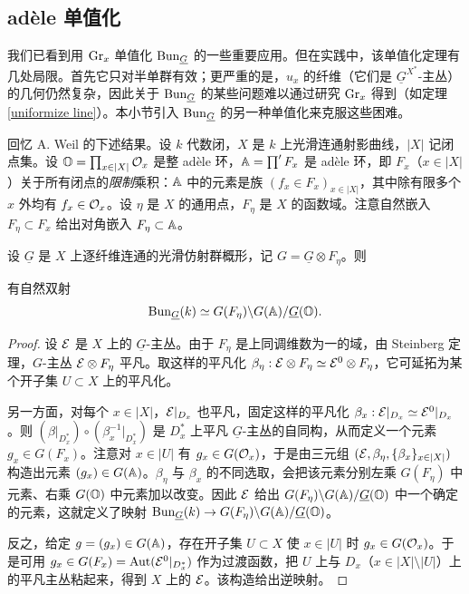 
\subsection{adèle 单值化}

我们已看到用 ${\operatorname{Gr}}_x$ 单值化 ${\operatorname{Bun}}_{\underline G}$ 的一些重要应用。但在实践中，该单值化定理有几处局限。首先它只对半单群有效；更严重的是，$u_x$ 的纤维（它们是 $\underline G^{X^*}$-主丛）的几何仍然复杂，因此关于 ${\operatorname{Bun}}_{\underline G}$ 的某些问题难以通过研究 ${\operatorname{Gr}}_x$ 得到（如定理 \ref{uniformize line}）。本小节引入 ${\operatorname{Bun}}_{\underline G}$ 的另一种单值化来克服这些困难。

回忆 A. Weil 的下述结果。设 $k$ 代数闭，$X$ 是 $k$ 上光滑连通射影曲线，$|X|$ 记闭点集。设 ${\mathbb O}=\prod_{x\in |X|} {\mathcal O}_x$ 是整 adèle 环，${\mathbb A}=\prod' F_x$ 是 adèle 环，即 $F_x$（$x\in |X|$）关于所有闭点的\emph{限制}乘积：${\mathbb A}$ 中的元素是族 $(f_x\in F_x)_{x\in |X|}$，其中除有限多个 $x$ 外均有 $f_x\in {\mathcal O}_x$。设 $\eta$ 是 $X$ 的通用点，$F_\eta$ 是 $X$ 的函数域。注意自然嵌入 $F_\eta\subset F_x$ 给出对角嵌入 $F_\eta\subset {\mathbb A}$。

设 $\underline G$ 是 $X$ 上逐纤维连通的光滑仿射群概形，记 $G=\underline G\otimes F_\eta$。则

\begin{lem}
有自然双射
\begin{equation}\label{Weil}
{\operatorname{Bun}}_{\underline G}(k)\simeq G(F_\eta)\backslash G({\mathbb A})/\underline G({\mathbb O}).
\end{equation}
\end{lem}

\begin{proof}
设 ${\mathcal E}$ 是 $X$ 上的 $\underline G$-主丛。由于 $F_\eta$ 是上同调维数为一的域，由 Steinberg 定理，$G$-主丛 ${\mathcal E}\otimes F_\eta$ 平凡。取这样的平凡化 $\beta_\eta: {\mathcal E}\otimes F_\eta\simeq {\mathcal E}^0\otimes F_\eta$，它可延拓为某个开子集 $U\subset X$ 上的平凡化。

另一方面，对每个 $x\in |X|$，${\mathcal E}|_{D_x}$ 也平凡，固定这样的平凡化 $\beta_x: {\mathcal E}|_{D_x}\simeq {\mathcal E}^0|_{D_x}$。则 $(\beta|_{D_x^*})\circ(\beta_x^{-1}|_{D_x^*})$ 是 $D_x^*$ 上平凡 $\underline G$-主丛的自同构，从而定义一个元素 $g_x\in G(F_x)$。注意对 $x\in |U|$ 有 $g_x\in G({\mathcal O}_x)$，于是由三元组 $({\mathcal E},\beta_\eta,\{\beta_x\}_{x\in |X|})$ 构造出元素 $(g_x)\in G({\mathbb A})$。$\beta_\eta$ 与 $\beta_x$ 的不同选取，会把该元素分别左乘 $G(F_\eta)$ 中元素、右乘 $G({\mathbb O})$ 中元素加以改变。因此 ${\mathcal E}$ 给出 $G(F_\eta)\backslash G({\mathbb A})/\underline G({\mathbb O})$ 中一个确定的元素，这就定义了映射 ${\operatorname{Bun}}_{\underline G}(k)\to G(F_\eta)\backslash G({\mathbb A})/\underline G({\mathbb O})$。

反之，给定 $g=(g_x)\in G({\mathbb A})$，存在开子集 $U\subset X$ 使 $x\in |U|$ 时 $g_x\in G({\mathcal O}_x)$。于是可用 $g_x\in G(F_x)={\operatorname{Aut}}({\mathcal E}^0|_{D_x^*})$ 作为过渡函数，把 $U$ 上与 $D_x$（$x\in |X|\setminus |U|$）上的平凡主丛粘起来，得到 $X$ 上的 ${\mathcal E}$。该构造给出逆映射。
\end{proof}

